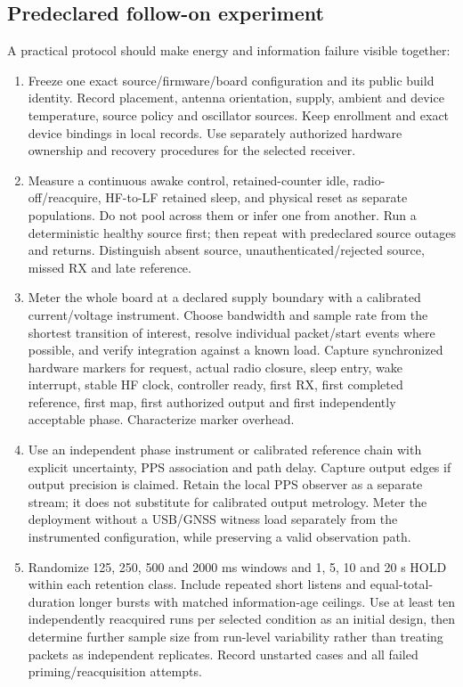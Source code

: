\documentclass[11pt,letterpaper]{article}
\begin{document}
\subsection{Predeclared follow-on experiment}
A practical protocol should make energy and information failure visible together:
\begin{enumerate}
\item Freeze one exact source/firmware/board configuration and its public build identity. Record placement, antenna orientation, supply, ambient and device temperature, source policy and oscillator sources. Keep enrollment and exact device bindings in local records. Use separately authorized hardware ownership and recovery procedures for the selected receiver.
\item Measure a continuous awake control, retained-counter idle, radio-off/reacquire, HF-to-LF retained sleep, and physical reset as separate populations. Do not pool across them or infer one from another. Run a deterministic healthy source first; then repeat with predeclared source outages and returns. Distinguish absent source, unauthenticated/rejected source, missed RX and late reference.
\item Meter the whole board at a declared supply boundary with a calibrated current/voltage instrument. Choose bandwidth and sample rate from the shortest transition of interest, resolve individual packet/start events where possible, and verify integration against a known load. Capture synchronized hardware markers for request, actual radio closure, sleep entry, wake interrupt, stable HF clock, controller ready, first RX, first completed reference, first map, first authorized output and first independently acceptable phase. Characterize marker overhead.
\item Use an independent phase instrument or calibrated reference chain with explicit uncertainty, PPS association and path delay. Capture output edges if output precision is claimed. Retain the local PPS observer as a separate stream; it does not substitute for calibrated output metrology. Meter the deployment without a USB/GNSS witness load separately from the instrumented configuration, while preserving a valid observation path.
\item Randomize 125, 250, 500 and 2000 ms windows and 1, 5, 10 and 20 s HOLD within each retention class. Include repeated short listens and equal-total-duration longer bursts with matched information-age ceilings. Use at least ten independently reacquired runs per selected condition as an initial design, then determine further sample size from run-level variability rather than treating packets as independent replicates. Record unstarted cases and all failed priming/reacquisition attempts.

\end{enumerate}
\end{document}
